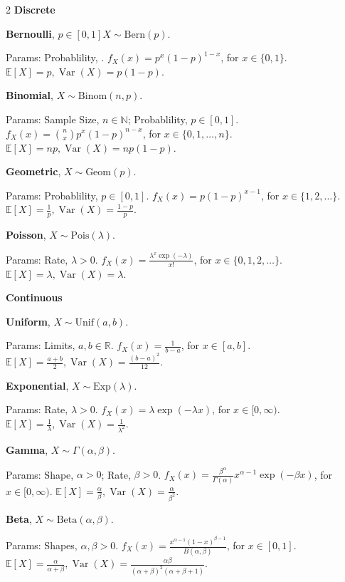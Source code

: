 \documentclass[10pt]{extarticle}
\theoremstyle{definition}
\theoremstyle{remark}
\newcommand{\R}{\mathbb{R}}
\newcommand{\N}{\mathbb{N}}
\newcommand{\E}{\mathbb{E}}
\DeclareMathOperator{\Var}{Var}
\begin{document}
\begin{multicols}{2}
    \noindent
    \textbf{Discrete}

    \textbf{Bernoulli}, $p \in [0, 1]X \sim \text{Bern}(p).$

    Params: Probablility, .
    $f_X(x) = p^x(1-p)^{1-x}$, for $x \in \{0,1\}$.
    $\E[X] = p, \Var(X) = p(1-p)$.

    \textbf{Binomial}, $X \sim \text{Binom}(n, p)$.

    Params: Sample Size, $n \in \N$; Probablility, $p \in [0, 1]$.
    $f_X(x) = \binom{n}{x}p^x(1-p)^{n-x}$, for $x \in \{0, 1, \ldots, n\}$.
    $\E[X] = np, \Var(X) = np(1-p)$.

    \textbf{Geometric}, $X \sim \text{Geom}(p)$.

    Params: Probablility, $p \in [0, 1]$.
    $f_X(x) = p(1-p)^{x - 1}$, for $x \in \{1, 2, \ldots\}$.
    $\E[X] = \frac{1}{p}, \Var(X) = \frac{1-p}{p}$.

    \textbf{Poisson}, $X \sim \text{Pois}(\lambda)$.
    
    Params: Rate, $\lambda > 0$.
    $f_X(x) = \frac{\lambda^x \exp(-\lambda)}{x!}$, for $x \in \{0, 1, 2, \ldots\}$.
    $\E[X] = \lambda, \Var(X) = \lambda$.

    \noindent
    \textbf{Continuous}

    \textbf{Uniform}, $X \sim \text{Unif}(a, b)$.

    Params: Limits, $a, b \in \R$.
    $f_X(x) = \frac{1}{b - a}$, for $x \in [a, b]$.
    $\E[X] = \frac{a + b}{2}, \Var(X) = \frac{(b - a)^2}{12}$.

    \textbf{Exponential}, $X \sim \text{Exp}(\lambda)$.

    Params: Rate, $\lambda > 0$.
    $f_X(x) = \lambda \exp(-\lambda x)$, for $x \in [0, \infty)$.
    $\E[X] = \frac{1}{\lambda}, \Var(X) = \frac{1}{\lambda^2}$.

    \textbf{Gamma}, $X \sim \Gamma(\alpha, \beta)$.

    Params: Shape, $\alpha > 0$; Rate, $\beta > 0$.
    $f_X(x) = \frac{\beta^\alpha}{\Gamma(\alpha)} x^{\alpha - 1} \exp(-\beta x)$, for $x \in [0, \infty)$.
    $\E[X] = \frac{\alpha}{\beta}, \Var(X) = \frac{\alpha}{\beta^2}$.

    \textbf{Beta}, $X \sim \text{Beta}(\alpha, \beta)$.

    Params: Shapes, $\alpha, \beta > 0$.
    $f_X(x) = \frac{x^{\alpha - 1}(1-x)^{\beta - 1}}{B(\alpha, \beta)}$, 
    for $x \in [0, 1]$.
    $\E[X] = \frac{\alpha}{\alpha + \beta}, 
    \Var(X) = \frac{\alpha\beta}{(\alpha + \beta)^2(\alpha + \beta + 1)}$.


\end{multicols}
\end{document}
